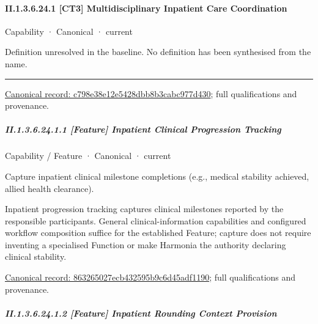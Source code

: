 \paragraph*{II.1.3.6.24.1 [CT3] Multidisciplinary Inpatient Care Coordination}
\label{navigation:II.1.3.6.24.1}

\label{element:c798e38e12e5428dbb8b3cabc977d430}
{\small Capability · Canonical · current}\par

Definition unresolved in the baseline. No definition has been synthesised from the name.



\medskip\hrule\medskip

{\footnotesize \href{../../../../continuum/strategy/capability/c798e38e12e5428dbb8b3cabc977d430.md}{Canonical record: c798e38e12e5428dbb8b3cabc977d430}; full qualifications and provenance.}\par
\subparagraph*{II.1.3.6.24.1.1 [Feature] Inpatient Clinical Progression Tracking}
\label{navigation:II.1.3.6.24.1.1}

\label{element:863265027ecb432595b9c6d45adf1190}
{\small Capability / Feature · Canonical · current}\par

Capture inpatient clinical milestone completions (e.g., medical stability achieved, allied health clearance).



Inpatient progression tracking captures clinical milestones reported by the responsible participants. General clinical-information capabilities and configured workflow composition suffice for the established Feature; capture does not require inventing a specialised Function or make Harmonia the authority declaring clinical stability.


{\footnotesize \href{../../../../continuum/strategy/capability/feature/863265027ecb432595b9c6d45adf1190.md}{Canonical record: 863265027ecb432595b9c6d45adf1190}; full qualifications and provenance.}\par
\subparagraph*{II.1.3.6.24.1.2 [Feature] Inpatient Rounding Context Provision}
\label{navigation:II.1.3.6.24.1.2}

